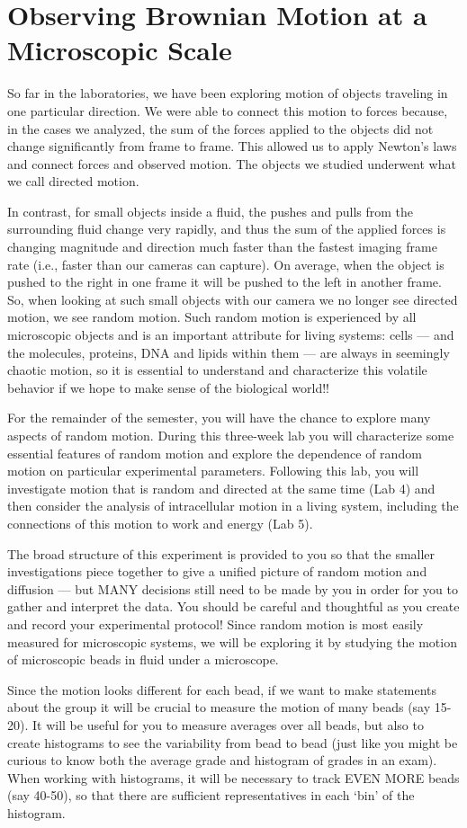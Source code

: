 \chapter{Observing Brownian Motion at a Microscopic Scale}
\thispagestyle{fancy}
%
So far in the laboratories, we have been exploring motion of objects traveling in one particular direction.
We were able to connect this motion to forces because, in the cases we analyzed, the sum of the forces applied to the objects did not change significantly from frame to frame.
This allowed us to apply Newton's laws and connect forces and observed motion.
The objects we studied underwent what we call directed motion.
\par
In contrast, for small objects inside a fluid, the pushes and pulls from the surrounding fluid change very rapidly, and thus the sum of the applied forces is changing magnitude and direction much faster than the fastest imaging frame rate (i.e., faster than our cameras can capture).
On average, when the object is pushed to the right in one frame it will be pushed to the left in another frame.
So, when looking at such small objects with our camera we no longer see directed motion, we see random motion.
Such random motion is experienced by all microscopic objects and is an important attribute for living systems: cells — and the molecules, proteins, DNA and lipids within them — are always in seemingly chaotic motion, so it is essential to understand and characterize this volatile behavior if we hope to make sense of the biological world!!
\par
For the remainder of the semester, you will have the chance to explore many aspects of random motion.
During this three-week lab you will characterize some essential features of random motion and explore the dependence of random motion on particular experimental parameters.
Following this lab, you will investigate motion that is random and directed at the same time (Lab 4) and then consider the analysis of intracellular motion in a living system, including the connections of this motion to work and energy (Lab 5).
\par 
The broad structure of this experiment is provided to you so that the smaller investigations piece together to give a unified picture of random motion and diffusion — but MANY decisions still need to be made by you in order for you to gather and interpret the data.
You should be careful and thoughtful as you create and record your experimental protocol!
Since random motion is most easily measured for microscopic systems, we will be exploring it by studying the motion of microscopic beads in fluid under a microscope.
\par
Since the motion looks different for each bead, if we want to make statements about the group it will be crucial to measure the motion of many beads (say 15-20).
It will be useful for you to measure averages over all beads, but also to create histograms to see the variability from bead to bead (just like you might be curious to know both the average grade and histogram of grades in an exam).
When working with histograms, it will be necessary to track EVEN MORE beads (say 40-50), so that there are sufficient representatives in each `bin' of the histogram.

